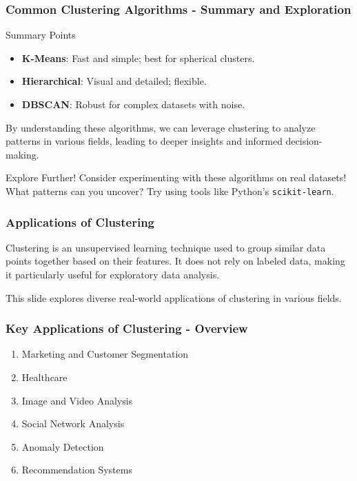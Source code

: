 \documentclass[aspectratio=169]{beamer}
\begin{document}
\begin{frame}[fragile]
    \frametitle{Common Clustering Algorithms - Summary and Exploration}
    \begin{block}{Summary Points}
        \begin{itemize}
            \item \textbf{K-Means}: Fast and simple; best for spherical clusters.
            \item \textbf{Hierarchical}: Visual and detailed; flexible.
            \item \textbf{DBSCAN}: Robust for complex datasets with noise.
        \end{itemize}
    \end{block}
    
    By understanding these algorithms, we can leverage clustering to analyze patterns in various fields, leading to deeper insights and informed decision-making.
    
    \begin{block}{Explore Further!}
        Consider experimenting with these algorithms on real datasets! What patterns can you uncover? Try using tools like Python's \texttt{scikit-learn}.
    \end{block}
\end{frame}

\begin{frame}[fragile]
  \frametitle{Applications of Clustering}
  
  Clustering is an unsupervised learning technique used to group similar data points together based on their features. It does not rely on labeled data, making it particularly useful for exploratory data analysis.

  This slide explores diverse real-world applications of clustering in various fields.
\end{frame}

\begin{frame}[fragile]
  \frametitle{Key Applications of Clustering - Overview}
  
  \begin{enumerate}
    \item Marketing and Customer Segmentation
    \item Healthcare
    \item Image and Video Analysis
    \item Social Network Analysis
    \item Anomaly Detection
    \item Recommendation Systems
  \end{enumerate}
\end{frame}
\end{document}

